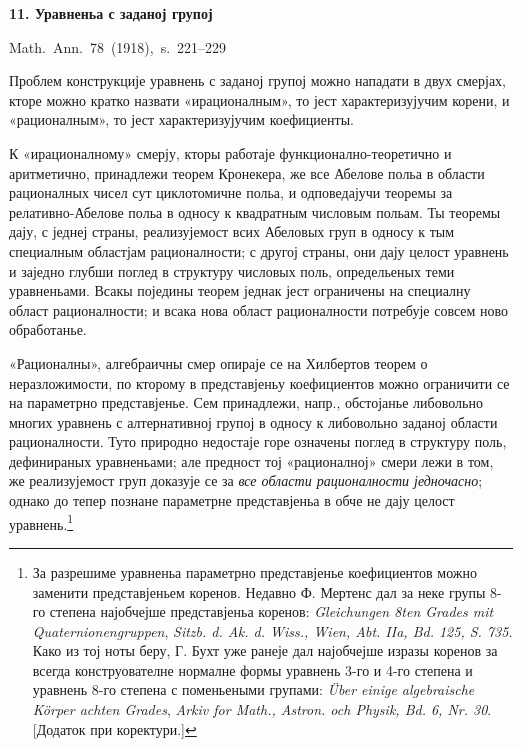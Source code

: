 ﻿\documentclass[11pt]{article}
\begin{document}

\begin{center}
{\Large\bfseries 11. Уравненьа с заданој групој}\par
\vspace{1.5em}
\mbox{Math. Ann. 78 (1918), s. 221--229}
\end{center}

\vspace{4em}

Проблем конструкције уравнень с заданој групој можно нападати в двух смерјах, кторе можно кратко назвати «ирационалным», то јест характеризујучим корени, и «рационалным», то јест характеризујучим коефициенты.

К «ирационалному» смерју, кторы работаје функционално-теоретично и аритметично, принадлежи теорем Кронекера, же все Абелове польа в области рационалных чисел сут циклотомичне польа, и одповедајучи теоремы за релативно-Абелове польа в односу к квадратным числовым польам. Ты теоремы дају, с једнеј страны, реализујемост всих Абеловых груп в односу к тым специалным областјам рационалности; с другој страны, они дају целост уравнень и заједно глубши поглед в структуру числовых поль, определьеных теми уравненьами. Всакы поједины теорем једнак јест ограничены на специалну област рационалности; и всака нова област рационалности потребује совсем ново обработанье.

«Рационалны», алгебраичны смер опираје се на Хилбертов теорем о неразложимости, по кторому в представјеньу коефициентов можно ограничити се на параметрно представјенье. Сем принадлежи, напр., обстојанье либовольно многих уравнень с алтернативној групој в односу к либовольно заданој области рационалности. Туто природно недостаје горе означены поглед в структуру поль, дефинираных уравненьами; але предност тој «рационалној» смери лежи в том, же реализујемост груп доказује се за {\itshape все области рационалности једночасно}; однако до тепер познане параметрне представјеньа в обче не дају целост уравнень.\footnote{За разрешиме уравненьа параметрно представјенье коефициентов можно заменити представјеньем коренов. Недавно Ф. Мертенс дал за неке групы 8-го степена најобчејше представјеньа коренов: \emph{Gleichungen 8ten Grades mit Quaternionengruppen}, \emph{Sitzb. d. Ak. d. Wiss., Wien, Abt. IIa, Bd. 125, S. 735}. Како из тој ноты беру, Г. Бухт уже ранеје дал најобчејше изразы коренов за всегда конструователне нормалне формы уравнень 3-го и 4-го степена и уравнень 8-го степена с поменьеными групами: \emph{Über einige algebraische Körper achten Grades}, \emph{Arkiv for Math., Astron. och Physik, Bd. 6, Nr. 30}. [Додаток при коректури.]} 
\end{document}
